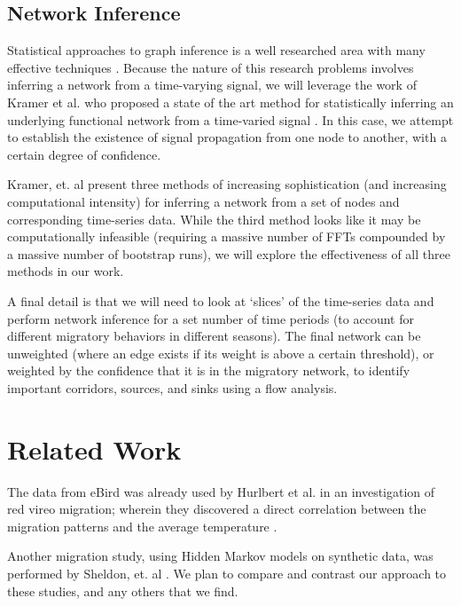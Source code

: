 \documentclass[11pt]{article}
\begin{document}
\begin{multicols}{2}
\subsection{Network Inference} 
Statistical approaches to graph inference is a well researched area with many effective techniques \cite{AlbertMechanics}. Because the nature of this research problems involves inferring a network from a time-varying signal, we will leverage the work of Kramer et al. who proposed a state of the art method for statistically inferring an underlying functional network from a time-varied signal \cite{kramer}. In this case, we attempt to establish the existence of signal propagation from one node to another, with a certain degree of confidence. 

Kramer, et. al present three methods of increasing sophistication (and increasing computational intensity) for inferring a network from a set of nodes and corresponding time-series data. While the third method looks like it may be computationally infeasible (requiring a massive number of FFTs compounded by a massive number of bootstrap runs), we will explore the effectiveness of all three methods in our work. 

A final detail is that we will need to look at `slices' of the time-series data and perform network inference for a set number of time periods (to account for different migratory behaviors in different seasons). The final network can be unweighted (where an edge exists if its weight is above a certain threshold), or weighted by the confidence that it is in the migratory network, to identify important corridors, sources, and sinks using a flow analysis. 

\section{Related Work}
The data from eBird was already used by Hurlbert et al. in an investigation of red vireo migration; wherein they discovered a direct correlation between the migration patterns and the average temperature \cite{hurlbert}. 

Another migration study, using Hidden Markov models on synthetic data, was performed by Sheldon, et. al \cite{conf/nips/SheldonEK07}. We plan to compare and contrast our approach to these studies, and any others that we find.


\end{multicols}
\end{document}
